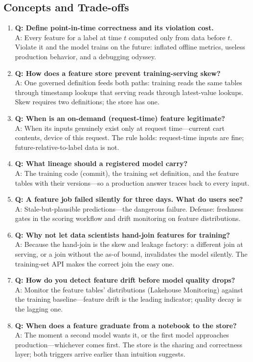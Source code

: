 \subsection{Concepts and Trade-offs}
\begin{enumerate}
    \item \textbf{Q: Define point-in-time correctness and its violation cost.}\\
    A: Every feature for a label at time $t$ computed only from data before $t$. Violate it and the model trains on the future: inflated offline metrics, useless production behavior, and a debugging odyssey.
    \item \textbf{Q: How does a feature store prevent training-serving skew?}\\
    A: One governed definition feeds both paths: training reads the same tables through timestamp lookups that serving reads through latest-value lookups. Skew requires two definitions; the store has one.
    \item \textbf{Q: When is an on-demand (request-time) feature legitimate?}\\
    A: When its inputs genuinely exist only at request time---current cart contents, device of this request. The rule holds: request-time inputs are fine; future-relative-to-label data is not.
    \item \textbf{Q: What lineage should a registered model carry?}\\
    A: The training code (commit), the training set definition, and the feature tables with their versions---so a production answer traces back to every input.
    \item \textbf{Q: A feature job failed silently for three days. What do users see?}\\
    A: Stale-but-plausible predictions---the dangerous failure. Defense: freshness gates in the scoring workflow and drift monitoring on feature distributions.
    \item \textbf{Q: Why not let data scientists hand-join features for training?}\\
    A: Because the hand-join is the skew and leakage factory: a different join at serving, or a join without the as-of bound, invalidates the model silently. The training-set API makes the correct join the easy one.
    \item \textbf{Q: How do you detect feature drift before model quality drops?}\\
    A: Monitor the feature tables' distributions (Lakehouse Monitoring) against the training baseline---feature drift is the leading indicator; quality decay is the lagging one.
    \item \textbf{Q: When does a feature graduate from a notebook to the store?}\\
    A: The moment a second model wants it, or the first model approaches production---whichever comes first. The store is the sharing and correctness layer; both triggers arrive earlier than intuition suggests.
\end{enumerate}

